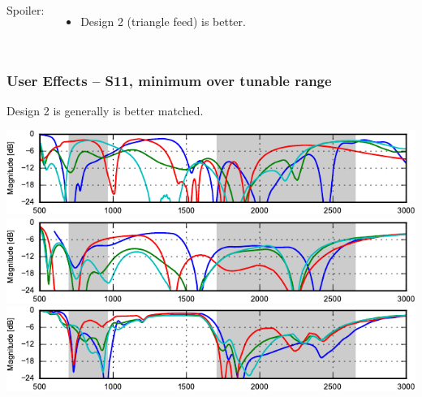 \begin{frame}
\begin{columns}[onlytextwidth,T]
        Spoiler:
        \begin{itemize}
            \item Design 2 (triangle feed) is better.
        \end{itemize}
    \end{columns}
\end{frame}

\begin{frame}
    \frametitle{User Effects -- S11, minimum over tunable range}
    Design 2 is generally is better matched.
    \begin{center}
        \includegraphics{img/soren/ue/design1lt/s11top.pdf}\\
        \includegraphics{img/soren/ue/design2sn/s11top.pdf}\\
        \includegraphics{img/soren/ue/design3hv/s11top.pdf}
    \end{center}
    \legendfooter
\end{frame}

